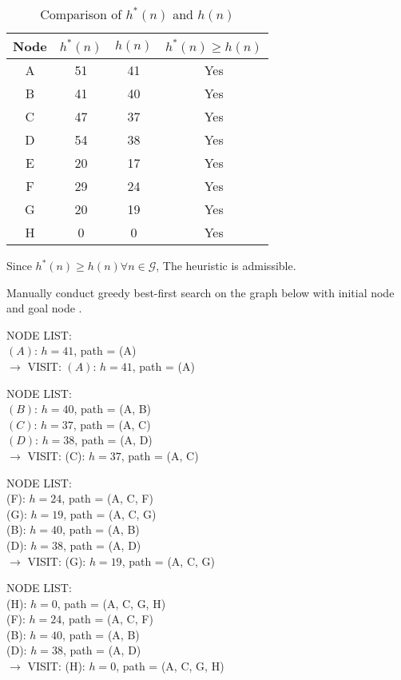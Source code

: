 \documentclass[12pt]{article}
\begin{document}
\begin{table}[!ht]
\centering
\begin{tabular}{|c|c|c|c|}
\hline
Node & $h^*(n)$ & $h(n)$ & $h^*(n) \geq h(n)$ \\
\hline
A & 51 & 41 & Yes \\
B & 41 & 40 & Yes \\
C & 47 & 37 & Yes \\
D & 54 & 38 & Yes \\
E & 20 & 17 & Yes \\
F & 29 & 24 & Yes \\
G & 20 & 19 & Yes \\
H & 0 & 0 & Yes \\
\hline
\end{tabular}
\caption{Comparison of $h^*(n)$ and $h(n)$}
\end{table}
\noindent
Since $h^*(n)\geq h(n)\forall n\in\mathcal{G}$, The heuristic is admissible.

\newpage
\problem Manually conduct greedy best-first search on the graph below with initial node  and goal node .

\noindent
NODE LIST:\\
$(A)$: $h=41$, path = (A)\\
$\rightarrow$ VISIT: $(A)$: $h=41$, path = (A)

\noindent
NODE LIST:\\
$(B)$: $h=40$, path = (A, B)\\
$(C)$: $h=37$, path = (A, C)\\
$(D)$: $h=38$, path = (A, D)\\
$\rightarrow$ VISIT: (C): $h=37$, path = (A, C)

\noindent
NODE LIST:\\
(F): $h=24$, path = (A, C, F)\\
(G): $h=19$, path = (A, C, G)\\
(B): $h=40$, path = (A, B)\\
(D): $h=38$, path = (A, D)\\
$\rightarrow$ VISIT: (G): $h=19$, path = (A, C, G)

\noindent
NODE LIST:\\
(H): $h=0$, path = (A, C, G, H)\\
(F): $h=24$, path = (A, C, F)\\
(B): $h=40$, path = (A, B)\\
(D): $h=38$, path = (A, D)\\
$\rightarrow$ VISIT: (H): $h=0$, path = (A, C, G, H)
\end{document}

